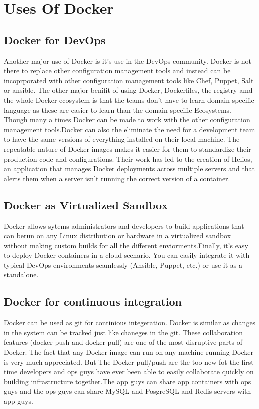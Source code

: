 \documentclass[9pt,twocolumn,twoside]{styles/osajnl}
\begin{document}
\section{Uses Of Docker}

\subsection{Docker for DevOps}
Another major use of Docker is it's use in the DevOps community. Docker 
is not there to replace other configuration management tools and instead 
can be incoprporated with other configuration management tools like 
Chef, Puppet, Salt or ansible. The other major benifit of using 
Docker, Dockerfiles, the registry amd the whole Docker ecosystem is that 
the teams don't have to learn domain specific language as these are 
easier to learn than the domain specific Ecosystems. Though many a times 
Docker can be made to work with the other configuration management 
tools.\cite{www-docker-1}Docker can also the eliminate the need for a 
development team to have the same versions of everything installed on 
their local machine. The repeatable nature of Docker images makes it 
easier for them to standardize their production code and configurations.
Their work has led to the creation of Helios, an application that manages
Docker deployments across multiple servers and that alerts them when a
server isn't running the correct version of a container.

\subsection{Docker as Virtualized Sandbox}
\cite{www-docker-1} Docker allows sytems administrators and developers
to build applications that can berun on any Linux distribution or
hardware in a virtualized sandbox without making custom builds for all
the different enviorments.Finally, it’s easy to deploy Docker
containers in a cloud scenario. You can easily integrate it with
typical DevOps environments seamlessly (Ansible, Puppet, etc.) or use
it as a standalone.

\subsection{Docker for continuous integration}
Docker can be used as git for continious integeration. Docker is
similar as changes in the system can be tracked just like chaneges in
the git.  These collaboration features (docker push and docker pull)
are one of the most disruptive parts of Docker. The fact that any
Docker image can run on any machine running Docker is very much
appreciated. But The Docker pull/push are the too new fot the first
time developers and ops guys have ever been able to easily collaborate
quickly on building infrastructure together.\cite{www-docker-2}The app
guys can share app containers with ops guys and the ops guys can share
MySQL and PosgreSQL and Redis servers with app guys.
\end{document}
